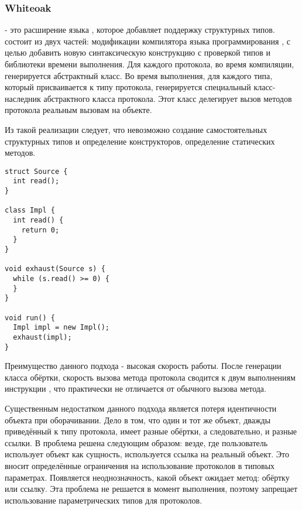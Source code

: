 \subsubsection{Whiteoak}
 - это расширение языка , которое добавляет поддержку структурных типов\cite{whiteoak}.  состоит из двух частей: модификации компилятора языка программирования , с целью добавить новую синтаксическую конструкцию с проверкой типов и библиотеки времени выполнения. Для каждого протокола, во время компиляции, генерируется абстрактный класс. Во время выполнения, для каждого типа, который присваивается к типу протокола, генерируется специальный класс-наследник абстрактного класса протокола. Этот класс делегирует вызов методов протокола реальным вызовам на объекте.

Из такой реализации следует, что невозможно создание самостоятельных структурных типов и определение конструкторов, определение статических методов.

\begin{verbatim}
struct Source {
  int read();
}

class Impl {
  int read() {
    return 0;
  }
}

void exhaust(Source s) {
  while (s.read() >= 0) {
  }
}

void run() {
  Impl impl = new Impl();
  exhaust(impl);
}

\end{verbatim}

Преимущество данного подхода - высокая скорость работы. После генерации класса обёртки, скорость вызова метода протокола сводится к двум выполнениям инструкции , что практически не отличается от обычного вызова метода.

Существенным недостатком данного подхода является потеря идентичности объекта при оборачивании. Дело в том, что один и тот же объект, дважды приведённый к типу протокола, имеет разные обёртки, а следовательно, и разные ссылки. В  проблема решена следующим образом: везде, где пользователь использует объект как сущность, используется ссылка на реальный объект. Это вносит определённые ограничения на использование протоколов в типовых параметрах. Появляется неоднозначность, какой объект ожидает метод: обёртку или ссылку. Эта проблема не решается в момент выполнения, поэтому  запрещает использование параметрических типов для протоколов.
